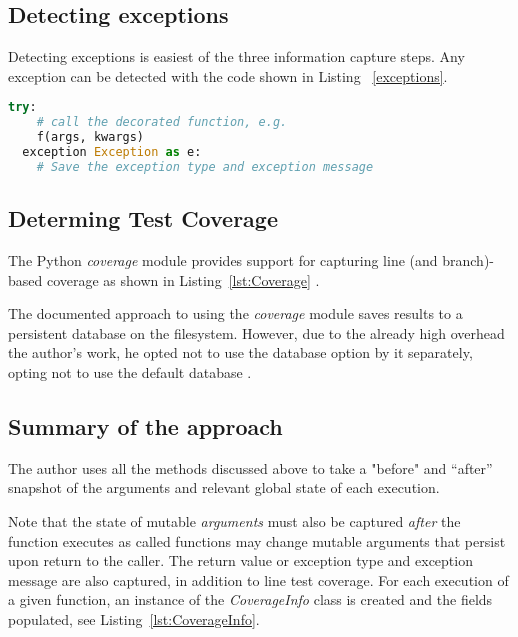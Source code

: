 \subsection{Detecting exceptions}\label{sec:approach-internal-3}
Detecting exceptions is easiest of the three information capture steps.
Any exception can be detected with the code shown in Listing 
~\ref{exceptions}.

\begin{lstlisting}[language=Python, caption={Catching and recording exceptions}, label={exceptions}]
  try:
    # call the decorated function, e.g.
    f(args, kwargs)
  exception Exception as e:
    # Save the exception type and exception message
  \end{lstlisting}

\subsection{Determing Test Coverage}\label{sec:approach-internal-4}
The Python \textit{coverage}
module provides support for capturing line (and branch)-based coverage
as shown in Listing~\ref{lst:Coverage} \cite{Batchelder}.



The documented approach to using the \textit{coverage} module 
saves results to a persistent database on the filesystem.
However, due to the already high overhead the author's work, he opted not 
to use the database option by it separately, 
opting not to use the default database \cite{Batchelder}.

\subsection{Summary of the approach}\label{sec:approach-internal-5}

The author uses all the methods discussed above to take a "before" and “after” 
snapshot of the arguments and relevant global state of each execution. 

Note that the state of mutable \textit{arguments} must also be captured 
\textit{after} the function executes as called functions may change mutable 
arguments that persist upon return to the caller. The return value or exception 
type and exception message are also captured, in addition to line test coverage. 
For each execution of a given function, an instance of the 
\textit{CoverageInfo} class is created and the fields populated, see 
Listing~\ref{lst:CoverageInfo}.

